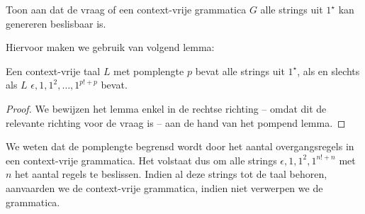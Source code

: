 \documentclass[a4paper]{article}
\begin{document}
\begin{question}
Toon aan dat de vraag of een context-vrije grammatica $G$ alle strings uit $1^{\star}$ kan genereren beslisbaar is.
\begin{answer}
Hiervoor maken we gebruik van volgend lemma:
\begin{lemma}
Een context-vrije taal $L$ met pomplengte $p$ bevat alle strings uit $1^{\star}$, als en slechts als $L$ $\epsilon,1,1^2,\ldots,1^{p!+p}$ bevat.
\begin{proof}
We bewijzen het lemma enkel in de rechtse richting -- omdat dit de relevante richting voor de vraag is -- aan de hand van het pompend lemma.
\end{proof}
\end{lemma}
We weten dat de pomplengte begrensd wordt door het aantal overgangsregels in een context-vrije grammatica. Het volstaat dus om alle strings $\epsilon,1,1^2,1^{n!+n}$ met $n$ het aantal regels te beslissen. Indien al deze strings tot de taal behoren, aanvaarden we de context-vrije grammatica, indien niet verwerpen we de grammatica.
\end{answer}
\end{question}
\end{document}
